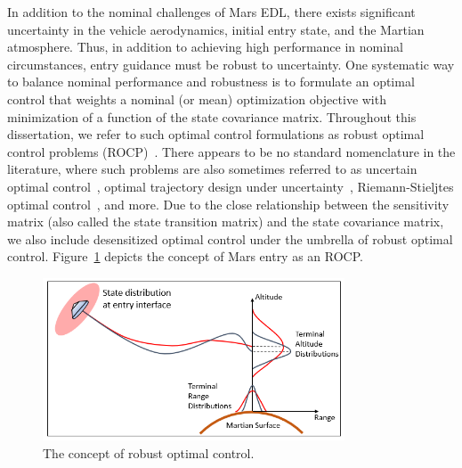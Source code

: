 In addition to the nominal challenges of Mars EDL, there exists significant uncertainty in the vehicle aerodynamics, initial entry state, and the Martian atmosphere. Thus, in addition to achieving high performance in nominal circumstances, entry guidance must be robust to uncertainty. 
One systematic way to balance nominal performance and robustness is to formulate an optimal control that weights a nominal (or mean) optimization objective with minimization of a function of the state covariance matrix.
Throughout this dissertation, we refer to such optimal control formulations as robust optimal control problems (ROCP)~\cite{RobustOptimalControl}. There appears to be no standard nomenclature in the literature, where such problems are also sometimes referred to as uncertain optimal control~\cite{PhelpsUncertainOCP}, optimal trajectory design under uncertainty~\cite{EntryOUUThesis2,darlington2000decreasing}, Riemann-Stieljtes optimal control~\cite{RossRSOCP}, and more. Due to the close relationship between the sensitivity matrix (also called the state transition matrix) and the state covariance matrix, we also include desensitized optimal control \cite{Desensitized,TrajectoryDesensitization} under the umbrella of robust optimal control. Figure~\ref{Fig:RobustTrajectoryOpt} depicts the concept of Mars entry as an ROCP. 
\begin{figure}[h!]
	\centering
	\includegraphics[width=0.8\textwidth]{Images/RobustTrajectoryOptimization}
	\caption{The concept of robust optimal control.}
	\label{Fig:RobustTrajectoryOpt}
\end{figure}

